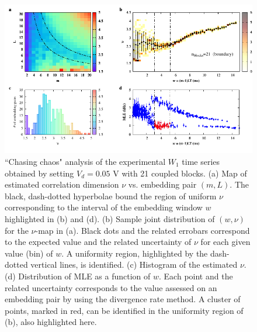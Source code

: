 \begin{figure}[H]
    \centering
    \includegraphics[width=\linewidth]{../blocks/21_blocks/edge/2e5_points/plots/chaos_low.pdf}
    \caption{``Chasing chaos" analysis of the experimental $W_1$ time series obtained by setting $V_d=0.05$ V with 21 coupled blocks.
    (a) Map of estimated correlation dimension $\nu$ vs. embedding pair $(m, L)$.
    The black, dash-dotted hyperbolae bound the region of uniform $\nu$ corresponding to the interval of the
    embedding window $w$ highlighted in (b) and (d).
    (b) Sample joint distribution of $(w,\nu)$ for the $\nu$-map in (a).
    Black dots and the related errobars correspond to the expected value and the related uncertainty of $\nu$
    for each given value (bin) of $w$. A uniformity region, highlighted by the dash-dotted vertical lines,
    is identified. (c) Histogram of the estimated $\nu$. (d) Distribution of MLE as a function of $w$. Each point and the related
    uncertainty corresponds to the value assessed on an embedding pair by using the divergence rate method.
    A cluster of points, marked in red, can be identified in the uniformity region of (b), also highlighted here.}
    \label{fig:21 blocks chaos}
\end{figure}


